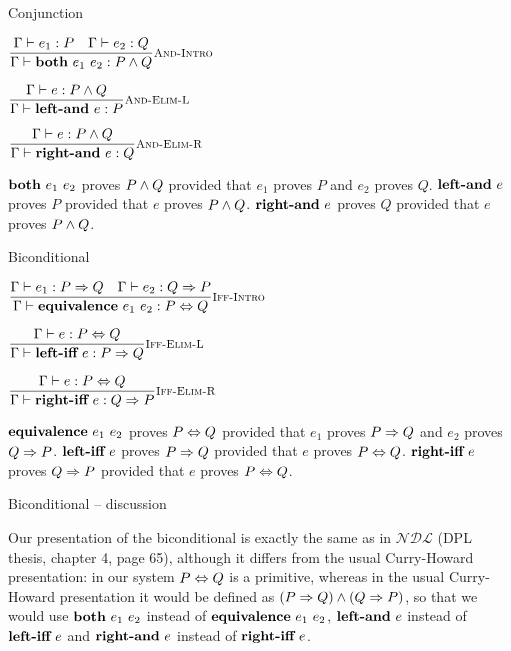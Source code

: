 \documentclass{beamer}
\newcommand{\NDL}{\mathcal{NDL}}
\begin{document}
\begin{frame}{Conjunction}

\begin{center}
  $\infrule[And-Intro]{\proves{e_1}{P} \quad \proves{e_2}{Q}}{\proves{\andintro{e_1}{e_2}}{\And{P}{Q}}}$

  \vspace{2em}

  $\infrule[And-Elim-L]{\proves{e}{\And{P}{Q}}}{\proves{\andeliml{e}}{P}}$

  \vspace{2em}

  $\infrule[And-Elim-R]{\proves{e}{\And{P}{Q}}}{\proves{\andelimr{e}}{Q}}$
\end{center}

\vspace{2em}

$\textbf{both}\ e_1\ e_2$ proves $P \land Q$ provided that $e_1$ proves $P$ and $e_2$ proves $Q$. $\textbf{left-and}\ e$ proves $P$ provided that $e$ proves $P \land Q$. $\textbf{right-and}\ e$ proves $Q$ provided that $e$ proves $P \land Q$.

\end{frame}

\begin{frame}{Biconditional}

\begin{center}
  $\infrule[Iff-Intro]{\proves{e_1}{\Impl{P}{Q}} \quad \proves{e_2}{\Impl{Q}{P}}}{\proves{\iffintro{e_1}{e_2}}{\Iff{P}{Q}}}$

  \vspace{2em}

  $\infrule[Iff-Elim-L]{\proves{e}{\Iff{P}{Q}}}{\proves{\iffeliml{e}}{\Impl{P}{Q}}}$

  \vspace{2em}

  $\infrule[Iff-Elim-R]{\proves{e}{\Iff{P}{Q}}}{\proves{\iffelimr{e}}{\Impl{Q}{P}}}$
\end{center}

\vspace{2em}

$\textbf{equivalence}\ e_1\ e_2$ proves $P \Leftrightarrow Q$ provided that $e_1$ proves $P \Rightarrow Q$ and $e_2$ proves $Q \Rightarrow P$. $\textbf{left-iff}\ e$ proves $P \Rightarrow Q$ provided that $e$ proves $P \Leftrightarrow Q$. $\textbf{right-iff}\ e$ proves $Q \Rightarrow P$ provided that $e$ proves $P \Leftrightarrow Q$.

\end{frame}

\begin{frame}{Biconditional -- discussion}

Our presentation of the biconditional is exactly the same as in $\NDL$ (DPL thesis, chapter 4, page 65), although it differs from the usual Curry-Howard presentation: in our system $P \Leftrightarrow Q$ is a primitive, whereas in the usual Curry-Howard presentation it would be defined as $(P \Rightarrow Q) \land (Q \Rightarrow P)$, so that we would use $\textbf{both}\ e_1\ e_2$ instead of $\textbf{equivalence}\ e_1\ e_2$, $\textbf{left-and}\ e$ instead of $\textbf{left-iff}\ e$ and $\textbf{right-and}\ e$ instead of $\textbf{right-iff}\ e$.

\end{frame}
\end{document}
